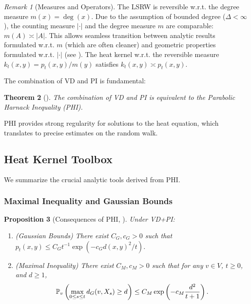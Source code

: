 \documentclass[12pt]{amsart}
\newtheorem{theorem}{Theorem}[section]
\newtheorem{proposition}[theorem]{Proposition}
\theoremstyle{definition}
\theoremstyle{remark}
\newtheorem{remark}[theorem]{Remark}
\newcommand{\Prob}{\mathbb{P}}
\begin{document}
\begin{remark}[Measures and Operators]\label{rem:measures_operators}
The LSRW is reversible w.r.t. the degree measure $m(x)=\deg(x)$. Due to the assumption of bounded degree ($\Delta < \infty$), the counting measure $|\cdot|$ and the degree measure $m$ are comparable: $m(A) \asymp |A|$. This allows seamless transition between analytic results formulated w.r.t. $m$ (which are often cleaner) and geometric properties formulated w.r.t. $|\cdot|$ (see \cite{Coulhon03}). The heat kernel w.r.t. the reversible measure $k_t(x,y) = p_t(x,y)/m(y)$ satisfies $k_t(x,y) \asymp p_t(x,y)$.
\end{remark}

The combination of VD and PI is fundamental:

\begin{theorem}[\cite{Delmotte99}]\label{thm:Delmotte}
The combination of VD and PI is equivalent to the Parabolic Harnack Inequality (PHI).
\end{theorem}

PHI provides strong regularity for solutions to the heat equation, which translates to precise estimates on the random walk.

\subsection{Heat Kernel Toolbox}
We summarize the crucial analytic tools derived from PHI.

\subsubsection{Maximal Inequality and Gaussian Bounds}

\begin{proposition}[Consequences of PHI, \cite{Delmotte99}]\label{prop:maximal}
Under VD+PI:
\begin{enumerate}
    \item (Gaussian Bounds) There exist $C_G, c_G > 0$ such that $p_t(x,y) \leq C_G t^{-1} \exp(-c_G d(x,y)^2/t)$.
    \item (Maximal Inequality) There exist $C_M,c_M > 0$ such that for any $v \in V$, $t \geq 0$, and $d \geq 1$,
    \begin{equation}\label{eq:max_ineq}
    \small
    \Prob_v\left( \max_{0 \leq s \leq t} d_G(v,X_s) \geq d \right) \leq C_M \exp\left(-c_M \frac{d^2}{t+1}\right).
    \end{equation}
\end{enumerate}
\end{proposition}
\end{document}
